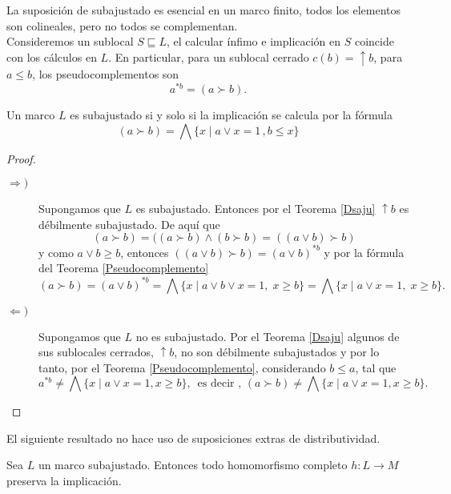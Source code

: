 \documentclass{comunicaciones}
\begin{document}
La suposición de subajustado es esencial en un marco finito, todos los elementos son colineales, pero no todos se complementan.\\

Consideremos un sublocal $S\sqsubseteq L$, el calcular ínfimo e implicación en $S$ coincide con los cálculos en $L$. En particular, para un sublocal cerrado $c(b)=\uparrow b$, para $a\leq b$, los pseudocomplementos son 
\[
a^{*b}=(a\succ b).
\]

\begin{thm}\label{Fimplicación}
    Un marco $L$ es subajustado si y solo si la implicación se calcula por la fórmula 
    \[
    (a\succ b)=\bigwedge\{x\mid a\vee x=1\, ,b\leq x\}
    \]
\end{thm}

\begin{proof}
    \begin{description}
        \item[$\Rightarrow )$] Supongamos que $L$ es subajustado. Entonces por el Teorema \ref{Dsaju} $\uparrow b$ es débilmente subajustado. De aquí que 
        \[
        (a\succ b)=((a\succ b)\wedge (b\succ b)=((a\vee b)\succ b)
        \]
        y como $a\vee b\geq b$, entonces $((a\vee b)\succ b)=(a\vee b)^{*b}$ y por la fórmula del Teorema \ref{Pseudocomplemento}
        \[
        (a\succ b)=(a\vee b)^{*b}=\bigwedge\{x\mid a\vee b\vee x=1,\; x\geq b\}=\bigwedge\{x\mid a\vee x=1,\; x\geq b\}.
        \]
        \item[$\Leftarrow )$] Supongamos que $L$ no es subajustado. Por el Teorema \ref{Dsaju} algunos de sus sublocales cerrados, $\uparrow b$, no son débilmente subajustados y por lo tanto, por el Teorema \ref{Pseudocomplemento}, considerando $b\leq a$, tal que 
        \[
        a^{*b}\neq \bigwedge\{x\mid a\vee x=1, x\geq b\},\,\mbox{ es decir },\,(a\succ b)\neq \bigwedge\{x\mid a\vee x=1, x\geq b\}.
        \]
    \end{description}
\end{proof}

El siguiente resultado no hace uso de suposiciones extras de distributividad.

\begin{thm}
    Sea $L$ un marco subajustado. Entonces todo homomorfismo completo $h\colon L\to M$ preserva la implicación.
\end{thm}
\end{document}
